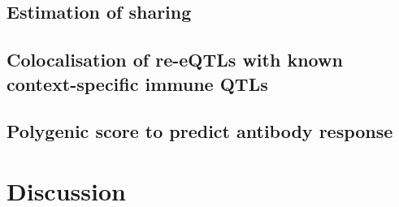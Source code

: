 
\subsection{Estimation of sharing}


\subsection{Colocalisation of re-eQTLs with known context-specific immune QTLs}


\subsection{Polygenic score to predict antibody response}

\section{Discussion}

